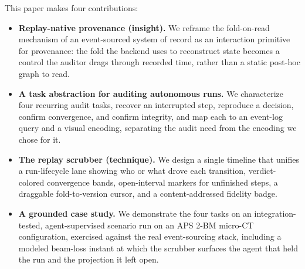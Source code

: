 \medskip\noindent This paper makes four contributions:
\begin{itemize}
  \item \textbf{Replay-native provenance (insight).} We reframe the
        fold-on-read mechanism of an event-sourced system of record as an
        interaction primitive for provenance: the fold the backend uses to
        reconstruct state becomes a control the auditor drags through recorded
        time, rather than a static post-hoc graph to read.
  \item \textbf{A task abstraction for auditing autonomous runs.} We
        characterize four recurring audit tasks, recover an interrupted step,
        reproduce a decision, confirm convergence, and confirm integrity, and
        map each to an event-log query and a visual encoding, separating the
        audit need from the encoding we chose for it.
  \item \textbf{The replay scrubber (technique).} We design a single timeline
        that unifies a run-lifecycle lane showing who or what drove each
        transition, verdict-colored convergence bands,
        open-interval markers for unfinished steps, a draggable fold-to-version
        cursor, and a content-addressed fidelity badge.
  \item \textbf{A grounded case study.} We demonstrate the four tasks on an
        integration-tested, agent-supervised scenario run on an APS 2-BM micro-CT
        configuration, exercised against the real event-sourcing stack,
        including a modeled beam-loss instant at which the scrubber surfaces the
        agent that held the run and the projection it left open.
\end{itemize}
